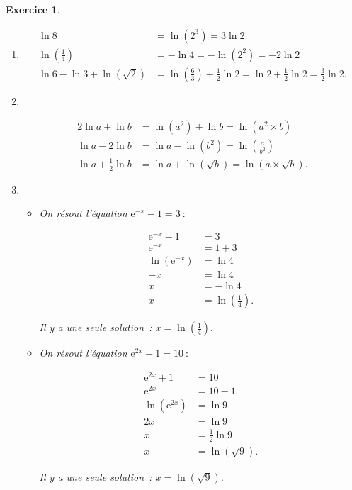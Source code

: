 \documentclass[10pt]{article}
\newtheorem{exo}{Exercice}
\begin{document}
\begin{exo}

~{}
\begin{enumerate}
\item \begin{align*}
\ln 8&=\ln\left(2^3\right)=3\ln 2\\
\ln\left(\frac{1}{4}\right)&=-\ln 4=-\ln\left(2^2\right)=-2\ln 2\\
\ln 6 -\ln 3+\ln\left(\sqrt{2}\right)&=\ln\left(\frac{6}{3}\right)+\frac{1}{2}\ln 2=\ln 2+\frac{1}{2}\ln 2=\frac{3}{2}\ln 2.
\end{align*}
\item ~{}

\begin{align*}
2\ln a+\ln b&=\ln\left(a^2\right)+\ln b=\ln\left(a^2\times b\right)\\
\ln a-2\ln b&=\ln a-\ln\left(b^2\right)=\ln\left(\frac{a}{b^2}\right)\\
\ln a+\frac{1}{2}\ln b&=\ln a+\ln\left(\sqrt{b}\right)=\ln\left(a\times \sqrt{b}\right).
\end{align*}
\item 

\begin{itemize}
\item[\textbullet] On résout l'équation $\text{e}^{-x}-1=3~:$

\begin{align*}\text{e}^{-x}-1&=3\\
\text{e}^{-x}&=1+3\\
\ln\left(\text{e}^{-x}\right)&=\ln 4\\
-x&=\ln 4\\
x&=-\ln 4\\
x&=\ln\left(\frac{1}{4}\right).
\end{align*}

Il y a une seule solution~: $x=\ln\left(\frac{1}{4}\right).$

\item[\textbullet] On résout l'équation $\text{e}^{2x}+1=10~:$

\begin{align*}\text{e}^{2x}+1&=10\\
\text{e}^{2x}&=10-1\\
\ln\left(\text{e}^{2x}\right)&=\ln 9\\
2x&=\ln 9\\
x&=\frac{1}{2}\ln 9\\
x&=\ln\left(\sqrt{9}\right).
\end{align*}

Il y a une seule solution~: $x=\ln\left(\sqrt{9}\right).$
\end{itemize}

\end{enumerate}

\end{exo}
\end{document}

